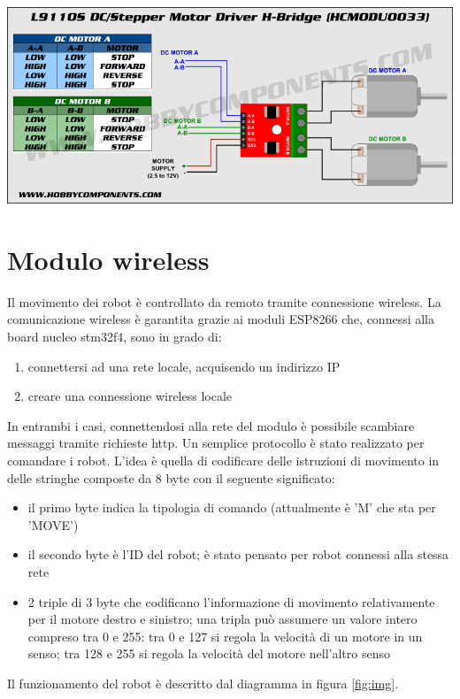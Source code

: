 \documentclass [11pt ,a4paper]{report}
\begin{document}
\begin{center}
\includegraphics[keepaspectratio, width=400pt]{Images/motor_driver_diagram.png}
\end{center}

\section{Modulo wireless} \label{communication}
Il movimento dei robot \`e controllato da remoto tramite connessione wireless. La comunicazione wireless \`e garantita grazie ai moduli ESP8266 che, connessi alla board nucleo stm32f4, sono in grado di:
\begin{enumerate}
	\item connettersi ad una rete locale, acquisendo un indirizzo IP
	\item creare una connessione wireless locale
\end{enumerate}
In entrambi i casi, connettendosi alla rete del modulo \`e possibile scambiare messaggi tramite richieste http. Un semplice protocollo \`e stato realizzato per comandare i robot. L'idea \`e quella di codificare delle istruzioni di movimento in delle stringhe composte da 8 byte con il seguente significato:
\begin{itemize}
	\item il primo byte indica la tipologia di comando (attualmente \`e 'M' che sta per 'MOVE')
	\item il secondo byte \`e l'ID del robot; \`e stato pensato per robot connessi alla stessa rete
	\item 2 triple di 3 byte che codificano l'informazione di movimento relativamente per il motore destro e sinistro; una tripla pu\`o assumere un valore intero compreso tra 0 e 255: tra 0 e 127 si regola la velocit\`a di un motore in un senso; tra 128 e 255 si regola la velocit\`a del motore nell'altro senso
\end{itemize}
Il funzionamento del robot \`e descritto dal diagramma in figura \ref{fig:img}.
\end{document}

